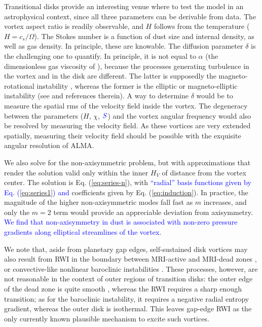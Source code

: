 \documentclass[apj]{emulateapj}
\def\blue#1{\textcolor{blue}{#1}}
\newcommand{\Eq}[1]{Eq. (\ref{#1})}
\newcommand{\eq}[1]{\Eq{#1}}
\begin{document}
Transitional disks provide an interesting venue where to test the
model in an astrophysical context, since all three parameters can be
derivable from data. The vortex aspect ratio is readily observable,
and $H$ follows from the temperature ($H=c_s/\varOmega$). The Stokes number is a function of
dust size and internal density, as well as gas density. In principle,
these are knowable. The diffusion parameter $\delta$ is the
challenging one to quantify. In principle, it is not equal to
$\alpha$ (the dimensionless gas viscosity of
\citealt{Shakura-Sunyaev73}), because the processes generating turbulence in the
vortex and in the disk are different. The latter is supposedly the
magneto-rotational instability \citep[MRI,][]{Balbus-Hawley91}, whereas the former is the elliptic or
magneto-elliptic instability (see \citealt{Lyra13} and references
therein). A way to determine $\delta$ would be to measure the spatial rms of
the velocity field inside the vortex. The degeneracy between the
parameters ($H$, $\chi$, $\blue{S}$) and the vortex angular frequency
would also be resolved by measuring the velocity field. As these
vortices are very extended spatially, measuring their velocity field
should be possible with the exquisite angular resolution of ALMA.

We also solve for the non-axisymmetric problem, but with
approximations that render the solution valid only within 
the inner $H_V$ of distance from the vortex center. The solution is
\eq{eq:series-n}, with \blue{``radial'' basis functions given by
\eq{eq:series1} and} coefficients given by \eq{eq:induction}. In practice, the magnitude
of the higher non-axisymmetric modes fall fast as $m$ increases, and 
only the $m=2$ term would provide an appreciable deviation from
axisymmetry. \blue{We find that non-axisymmetry in dust 
is associated with non-zero pressure gradients along elliptical streamlines of the vortex.}

We note that, aside from planetary gap edges, self-sustained disk
vortices may also result from RWI in the boundary between MRI-active and MRI-dead zones \citep{Varniere-Tagger06,Lyra08,Lyra09a,Lyra-MacLow12}, or
convective-like nonlinear baroclinic instabilities \citep{Klahr-Bodenheimer03,Klahr04,Petersen07a,Petersen07b,Lesur-Papaloizou10,Lyra-Klahr11,Raettig13}. 
These processes, however, are not reasonable in the context of outer
regions of transition disks: the outer edge of the dead zone is quite smooth
\citep{Dzyurkevich13,Landry13}, whereas the RWI requires a 
sharp enough transition; as for the baroclinic instability, it
requires a negative radial entropy gradient, whereas the outer disk is
isothermal. This leaves gap-edge RWI as the only currently known plausible mechanism to excite such vortices. 
\end{document}
